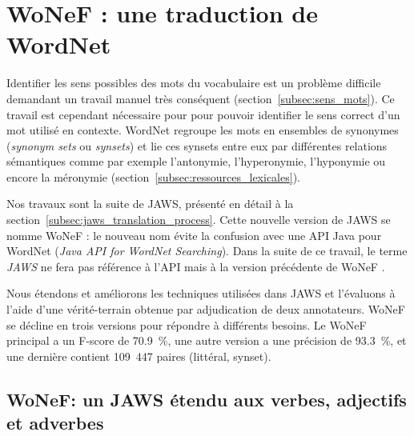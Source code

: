 

\chapter{WoNeF : une traduction de WordNet}
\label{ch:wonef} 

Identifier les sens possibles des mots du vocabulaire est un problème difficile
demandant un travail manuel très conséquent (section~\ref{subsec:sens_mots}).
Ce travail est cependant nécessaire pour pour pouvoir identifier le sens
correct d'un mot utilisé en contexte. WordNet \citep{fellbaum1998wordnet}
regroupe les mots en ensembles de synonymes (\emph{synonym sets} ou
\emph{synsets}) et lie ces synsets entre eux par différentes relations
sémantiques comme par exemple l'antonymie, l'hyperonymie, l'hyponymie ou encore
la méronymie (section~\ref{subsec:ressources_lexicales}).

Nos travaux \citep{pradet2013wonef} sont la suite de JAWS, présenté en détail à la
section~\ref{subsec:jaws_translation_process}. Cette nouvelle version de JAWS
se nomme WoNeF : le nouveau nom évite la confusion avec une API Java pour
WordNet (\emph{Java API for WordNet Searching}). Dans la suite de ce travail,
le terme \emph{JAWS} ne fera pas référence à l'API mais à la version précédente
de WoNeF \citep{mouton2010jaws,mouton2010phd}.

Nous étendons et améliorons les techniques utilisées dans JAWS et l'évaluons à
l'aide d'une vérité-terrain obtenue par adjudication de deux annotateurs. WoNeF
se décline en trois versions pour répondre à différents besoins. Le WoNeF
principal a un F-score de 70.9~\%, une autre version a une précision de
93.3~\%, et une dernière contient 109~447 paires (littéral, synset).

\section{WoNeF: un JAWS étendu aux verbes, adjectifs et adverbes}
\label{sec:improving_jaws}

